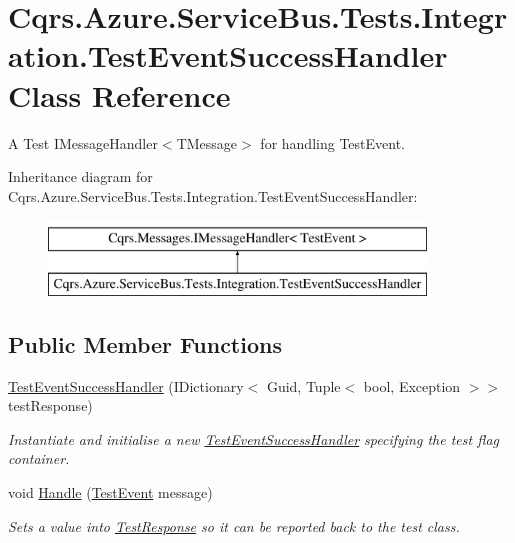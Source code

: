 \hypertarget{classCqrs_1_1Azure_1_1ServiceBus_1_1Tests_1_1Integration_1_1TestEventSuccessHandler}{}\section{Cqrs.\+Azure.\+Service\+Bus.\+Tests.\+Integration.\+Test\+Event\+Success\+Handler Class Reference}
\label{classCqrs_1_1Azure_1_1ServiceBus_1_1Tests_1_1Integration_1_1TestEventSuccessHandler}


A Test I\+Message\+Handler$<$\+T\+Message$>$ for handling Test\+Event.  


Inheritance diagram for Cqrs.\+Azure.\+Service\+Bus.\+Tests.\+Integration.\+Test\+Event\+Success\+Handler\+:\begin{figure}[H]
\begin{center}
\leavevmode
\includegraphics[height=2.000000cm]{classCqrs_1_1Azure_1_1ServiceBus_1_1Tests_1_1Integration_1_1TestEventSuccessHandler}
\end{center}
\end{figure}
\subsection*{Public Member Functions}
\begin{DoxyCompactItemize}
\item 
\hyperlink{classCqrs_1_1Azure_1_1ServiceBus_1_1Tests_1_1Integration_1_1TestEventSuccessHandler_ab39bc54e4c49cf338e3c47627d367c72_ab39bc54e4c49cf338e3c47627d367c72}{Test\+Event\+Success\+Handler} (I\+Dictionary$<$ Guid, Tuple$<$ bool, Exception $>$$>$ test\+Response)
\begin{DoxyCompactList}\small\item\em Instantiate and initialise a new \hyperlink{classCqrs_1_1Azure_1_1ServiceBus_1_1Tests_1_1Integration_1_1TestEventSuccessHandler}{Test\+Event\+Success\+Handler} specifying the test flag container. \end{DoxyCompactList}\item 
void \hyperlink{classCqrs_1_1Azure_1_1ServiceBus_1_1Tests_1_1Integration_1_1TestEventSuccessHandler_a6091c03591fd162a96fcba89a40f8d2f_a6091c03591fd162a96fcba89a40f8d2f}{Handle} (\hyperlink{classCqrs_1_1Azure_1_1ServiceBus_1_1Tests_1_1Unit_1_1TestEvent}{Test\+Event} message)
\begin{DoxyCompactList}\small\item\em Sets a value into \hyperlink{classCqrs_1_1Azure_1_1ServiceBus_1_1Tests_1_1Integration_1_1TestEventSuccessHandler_a01443ad3c6558530400b8cff76796fca_a01443ad3c6558530400b8cff76796fca}{Test\+Response} so it can be reported back to the test class. \end{DoxyCompactList}\end{DoxyCompactItemize}

